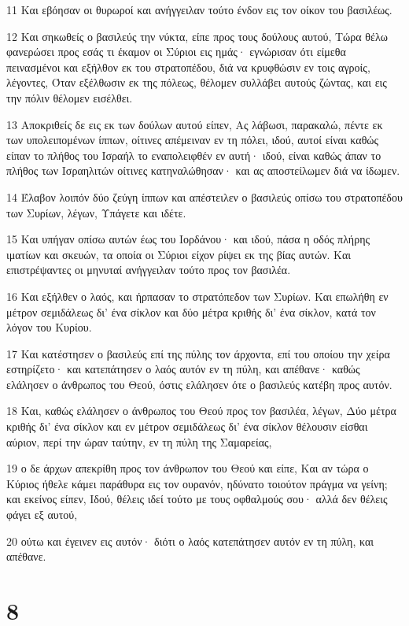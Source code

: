 \par 11 Και εβόησαν οι θυρωροί και ανήγγειλαν τούτο ένδον εις τον οίκον του βασιλέως.
\par 12 Και σηκωθείς ο βασιλεύς την νύκτα, είπε προς τους δούλους αυτού, Τώρα θέλω φανερώσει προς εσάς τι έκαμον οι Σύριοι εις ημάς· εγνώρισαν ότι είμεθα πεινασμένοι και εξήλθον εκ του στρατοπέδου, διά να κρυφθώσιν εν τοις αγροίς, λέγοντες, Όταν εξέλθωσιν εκ της πόλεως, θέλομεν συλλάβει αυτούς ζώντας, και εις την πόλιν θέλομεν εισέλθει.
\par 13 Αποκριθείς δε εις εκ των δούλων αυτού είπεν, Ας λάβωσι, παρακαλώ, πέντε εκ των υπολειπομένων ίππων, οίτινες απέμειναν εν τη πόλει, ιδού, αυτοί είναι καθώς είπαν το πλήθος του Ισραήλ το εναπολειφθέν εν αυτή· ιδού, είναι καθώς άπαν το πλήθος των Ισραηλιτών οίτινες κατηναλώθησαν· και ας αποστείλωμεν διά να ίδωμεν.
\par 14 Έλαβον λοιπόν δύο ζεύγη ίππων και απέστειλεν ο βασιλεύς οπίσω του στρατοπέδου των Συρίων, λέγων, Υπάγετε και ιδέτε.
\par 15 Και υπήγαν οπίσω αυτών έως του Ιορδάνου· και ιδού, πάσα η οδός πλήρης ιματίων και σκευών, τα οποία οι Σύριοι είχον ρίψει εκ της βίας αυτών. Και επιστρέψαντες οι μηνυταί ανήγγειλαν τούτο προς τον βασιλέα.
\par 16 Και εξήλθεν ο λαός, και ήρπασαν το στρατόπεδον των Συρίων. Και επωλήθη εν μέτρον σεμιδάλεως δι' ένα σίκλον και δύο μέτρα κριθής δι' ένα σίκλον, κατά τον λόγον του Κυρίου.
\par 17 Και κατέστησεν ο βασιλεύς επί της πύλης τον άρχοντα, επί του οποίου την χείρα εστηρίζετο· και κατεπάτησεν ο λαός αυτόν εν τη πύλη, και απέθανε· καθώς ελάλησεν ο άνθρωπος του Θεού, όστις ελάλησεν ότε ο βασιλεύς κατέβη προς αυτόν.
\par 18 Και, καθώς ελάλησεν ο άνθρωπος του Θεού προς τον βασιλέα, λέγων, Δύο μέτρα κριθής δι' ένα σίκλον και εν μέτρον σεμιδάλεως δι' ένα σίκλον θέλουσιν είσθαι αύριον, περί την ώραν ταύτην, εν τη πύλη της Σαμαρείας,
\par 19 ο δε άρχων απεκρίθη προς τον άνθρωπον του Θεού και είπε, Και αν τώρα ο Κύριος ήθελε κάμει παράθυρα εις τον ουρανόν, ηδύνατο τοιούτον πράγμα να γείνη; και εκείνος είπεν, Ιδού, θέλεις ιδεί τούτο με τους οφθαλμούς σου· αλλά δεν θέλεις φάγει εξ αυτού,
\par 20 ούτω και έγεινεν εις αυτόν· διότι ο λαός κατεπάτησεν αυτόν εν τη πύλη, και απέθανε.

\chapter{8}

